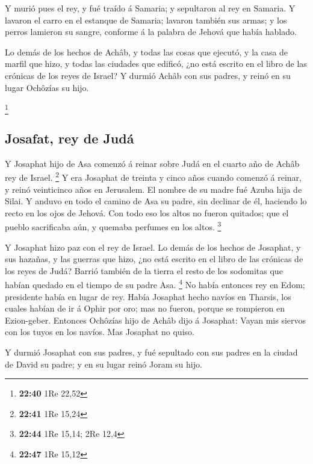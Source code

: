  Y murió pues el rey, y fué traído á Samaria; y
sepultaron al rey en Samaria.  Y lavaron el carro en el
estanque de Samaria; lavaron también sus armas; y los perros lamieron su
sangre, conforme á la palabra de Jehová que había hablado.

 Lo demás de los hechos de Achâb, y todas las cosas que
ejecutó, y la casa de marfil que hizo, y todas las ciudades que edificó,
¿no está escrito en el libro de las crónicas de los reyes de Israel?
 Y durmió Achâb con sus padres, y reinó en su lugar
Ochôzías su hijo.

\footnote{\textbf{22:40} 1Re 22,52}

\hypertarget{josafat-rey-de-juduxe1}{%
\subsection{Josafat, rey de Judá}\label{josafat-rey-de-juduxe1}}

 Y Josaphat hijo de Asa comenzó á reinar sobre Judá en el
cuarto año de Achâb rey de Israel. \footnote{\textbf{22:41} 1Re 15,24}
 Y era Josaphat de treinta y cinco años cuando comenzó á
reinar, y reinó veinticinco años en Jerusalem. El nombre de su madre fué
Azuba hija de Silai.  Y anduvo en todo el camino de Asa
su padre, sin declinar de él, haciendo lo recto en los ojos de Jehová.
 Con todo eso los altos no fueron quitados; que el pueblo
sacrificaba aún, y quemaba perfumes en los altos. \footnote{\textbf{22:44}
  1Re 15,14; 2Re 12,4}

 Y Josaphat hizo paz con el rey de Israel.
 Lo demás de los hechos de Josaphat, y sus hazañas, y las
guerras que hizo, ¿no está escrito en el libro de las crónicas de los
reyes de Judá?  Barrió también de la tierra el resto de
los sodomitas que habían quedado en el tiempo de su padre Asa.
\footnote{\textbf{22:47} 1Re 15,12}  No había entonces
rey en Edom; presidente había en lugar de rey.  Había
Josaphat hecho navíos en Tharsis, los cuales habían de ir á Ophir por
oro; mas no fueron, porque se rompieron en Ezion-geber. 
Entonces Ochôzías hijo de Achâb dijo á Josaphat: Vayan mis siervos con
los tuyos en los navíos. Mas Josaphat no quiso.

 Y durmió Josaphat con sus padres, y fué sepultado con
sus padres en la ciudad de David su padre; y en su lugar reinó Joram su
hijo.

